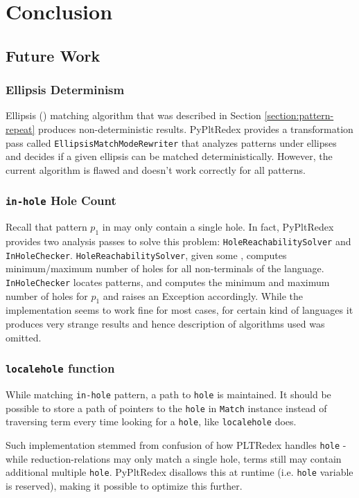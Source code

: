 \chapter{Conclusion}

\section{Future Work}
\subsection{Ellipsis Determinism}
Ellipsis (\RepeatNoArg) matching algorithm that was described in Section \ref{section:pattern-repeat} produces non-deterministic results. PyPltRedex provides a transformation pass called \texttt{EllipsisMatchModeRewriter} that analyzes patterns under ellipses and decides if a given ellipsis can be matched deterministically. However, the current algorithm is flawed and doesn't work correctly for all patterns.

\subsection{\texttt{in-hole} Hole Count}
Recall that pattern $p_1$ in \PatternInHole \space may only contain a single hole. In fact, PyPltRedex provides two analysis passes to solve this problem: \texttt{HoleReachabilitySolver} and \texttt{InHoleChecker}. \texttt{HoleReachabilitySolver}, given some \DefineLanguageNoArg, computes minimum/maximum number of holes for all non-terminals of the language. \texttt{InHoleChecker} locates \PatternInHoleNoArg patterns, and computes the minimum and maximum number of holes for $p_1$ and raises an Exception accordingly. While the implementation seems to work fine for most cases, for certain kind of languages it produces very strange results and hence description of algorithms used was omitted.

\subsection{\texttt{localehole} function}
While matching \texttt{in-hole} pattern, a path to \texttt{hole} is maintained. It should be possible to store a path of pointers to the \texttt{hole} in \texttt{Match} instance instead of traversing term every time looking for a \texttt{hole}, like \texttt{localehole} does.

Such implementation stemmed from confusion of how PLTRedex handles \texttt{hole} - while reduction-relations may only match a single hole, terms still may contain additional multiple \texttt{hole}. PyPltRedex disallows this at runtime (i.e. \texttt{hole} variable is reserved), making it possible to optimize this further.

